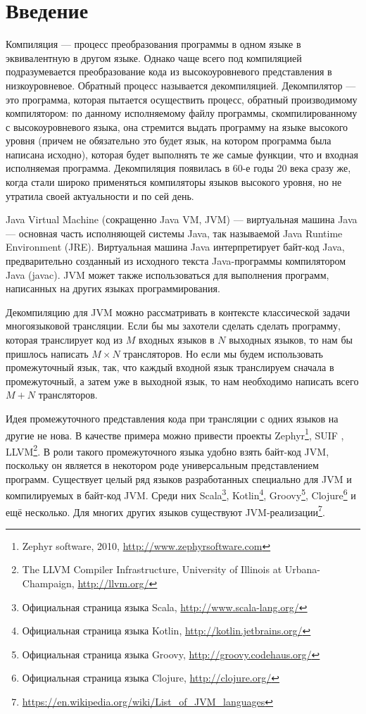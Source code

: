 \documentclass[14pt]{extarticle}
\begin{document}
\fi

\section*{Введение}
\sloppy
Компиляция — процесс преобразования программы в одном языке в эквивалентную в другом языке. Однако чаще всего под компиляцией подразумевается преобразование кода из высокоуровневого представления в низкоуровневое. Обратный процесс называется декомпиляцией. Декомпилятор --- это программа, которая пытается осуществить процесс, обратный производимому компилятором: по данному исполняемому файлу программы, скомпилированному с высокоуровневого языка, она стремится выдать программу на языке высокого уровня (причем не обязательно это будет язык, на котором программа была написана исходно), которая будет выполнять те же самые функции, что и входная исполняемая программа. Декомпиляция появилась в 60-е годы 20 века сразу же, когда стали широко применяться компиляторы языков высокого уровня, но не утратила своей актуальности и по сей день.

Java Virtual Machine (сокращенно Java VM, JVM) \cite{jvms} --- виртуальная машина Java --- основная часть исполняющей системы Java, так называемой Java Runtime Environment (JRE). Виртуальная машина Java интерпретирует байт-код Java, предварительно созданный из исходного текста Java-программы компилятором Java (javac). JVM может также использоваться для выполнения программ, написанных на других языках программирования.

Декомпиляцию для JVM можно рассматривать в контексте классической задачи многоязыковой трансляции. Если бы мы захотели сделать сделать программу, которая транслирует код из $M$ входных языков в $N$ выходных языков, то нам бы пришлось написать $M\times N$ трансляторов. Но если мы будем использовать промежуточный язык, так, что каждый входной язык транслируем сначала в промежуточный, а затем уже в выходной язык, то нам необходимо написать всего $M + N$ трансляторов. 

Идея промежуточного представления кода при трансляции с одних языков на другие не нова. В качестве примера можно привести проекты Zephyr\footnote{Zephyr software, 2010, \url{http://www.zephyrsoftware.com}}, SUIF \cite{book:suif}, LLVM\footnote{The LLVM Compiler Infrastructure, University of Illinois at Urbana-Champaign, \url{http://llvm.org/}}. 
В роли такого промежуточного языка удобно взять байт-код JVM, поскольку он является в некотором роде универсальным представлением программ. Существует целый ряд языков разработанных специально для JVM и компилируемых в байт-код JVM. Среди них Scala\footnote{Официальная страница языка Scala, \url{http://www.scala-lang.org/}}, Kotlin\footnote{Официальная страница языка Kotlin, \url{http://kotlin.jetbrains.org/}}, Groovy\footnote{Официальная страница языка Groovy, \url{http://groovy.codehaus.org/}}, Clojure\footnote{Официальная страница языка Clojure, \url{http://clojure.org/}} и ещё несколько. Для многих других языков существуют JVM-реализации\footnote{\url{https://en.wikipedia.org/wiki/List_of_JVM_languages}}. 
\end{document}
